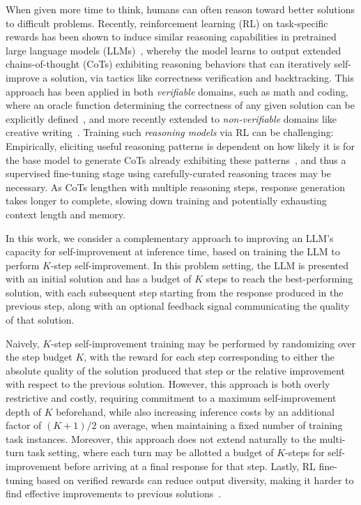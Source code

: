 \documentclass[10pt]{article} %
\begin{document}
When given more time to think, humans can often reason toward better solutions to difficult problems. Recently, reinforcement learning (RL) on task-specific rewards has been shown to induce similar reasoning capabilities in pretrained large language models (LLMs)~\citep{zelikman2022star, jaech2024openai, guo2025deepseek}, whereby the model learns to output extended chains-of-thought (CoTs) exhibiting reasoning behaviors that can iteratively self-improve a solution, via tactics like correctness verification and backtracking. This approach has been applied in both \emph{verifiable} domains, such as math and coding, where an oracle function determining the correctness of any given solution can be explicitly defined~\citep{lambert2024tulu}, and more recently extended to \emph{non-verifiable} domains like creative writing~\citep{gurung2025learning, zhou2025reinforcing}. 
Training such \emph{reasoning models} via RL can be challenging: Empirically, eliciting useful reasoning patterns is dependent on how likely it is for the base model to generate CoTs already exhibiting these patterns~\citep{gandhi2025cognitive}, and thus a supervised fine-tuning stage using carefully-curated reasoning traces may be necessary. As CoTs lengthen with multiple reasoning steps, response generation takes longer to complete, slowing down training and potentially exhausting context length and memory.

In this work, we consider a complementary approach to improving an LLM's capacity for self-improvement at inference time, based on training the LLM to perform $K$-step self-improvement. In this problem setting, the LLM is presented with an initial solution and has a budget of $K$ steps to reach the best-performing solution, with each subsequent step starting from the response produced in the previous step, along with an optional feedback signal communicating the quality of that solution.  

Naively, $K$-step self-improvement training may be performed by randomizing over the step budget $K$, with the reward for each step corresponding to either the absolute quality of the solution produced that step or the relative improvement with respect to the previous solution. However, this approach is both overly restrictive and costly, requiring commitment to a maximum self-improvement depth of $K$ beforehand, while also increasing inference costs by an additional factor of $(K+1)/2$ on average, when maintaining a fixed number of training task instances. Moreover, this approach does not extend naturally to the multi-turn task setting, where each turn may be allotted a budget of $K$-steps for self-improvement before arriving at a final response for that step. Lastly, RL fine-tuning based on verified rewards can reduce output diversity, making it harder to find effective improvements to previous solutions~\citep{wu2025invisible}.
\end{document}
